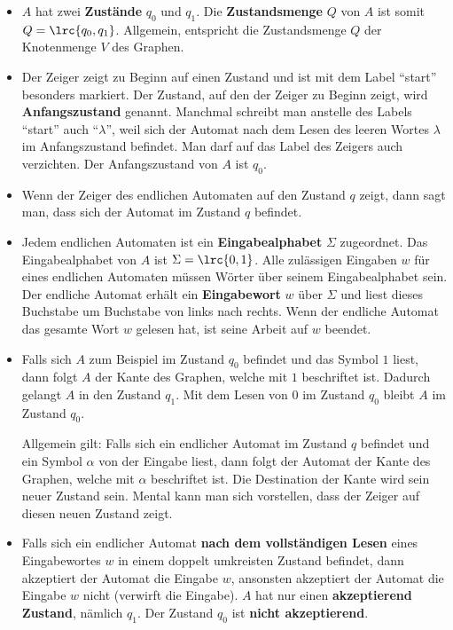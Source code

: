 \begin{itemize}
	\item $A$ hat zwei \textbf{Zustände} $q_0$ und $q_1$. Die \textbf{Zustandsmenge} $Q$ von $A$ ist somit $Q = \lrc{q_0,q_1}$. Allgemein, entspricht die Zustandsmenge $Q$ der Knotenmenge $V$ des Graphen.
	\item Der Zeiger zeigt zu Beginn auf einen Zustand und ist mit dem Label \enquote{start} besonders markiert. Der Zustand, auf den der Zeiger zu Beginn zeigt, wird \textbf{Anfangszustand} genannt. Manchmal schreibt man anstelle des Labels \enquote{start} auch \enquote{$\lambda$}, weil sich der Automat nach dem Lesen des leeren Wortes $\lambda$ im Anfangszustand befindet. Man darf auf das Label des Zeigers auch verzichten. Der Anfangszustand von $A$ ist $q_0$.
	\item Wenn der Zeiger des endlichen Automaten auf den Zustand $q$ zeigt, dann sagt man, dass sich der Automat im Zustand $q$ befindet.
	\item Jedem endlichen Automaten ist ein \textbf{Eingabealphabet} $\Sigma$ zugeordnet. Das Eingabealphabet von $A$ ist $\Sigma = \lrc{0,1}$. Alle zulässigen Eingaben $w$ für eines endlichen Automaten müssen Wörter über seinem Eingabealphabet sein. Der endliche Automat erhält ein \textbf{Eingabewort} $w$ über $\Sigma$ und liest dieses Buchstabe um Buchstabe von links nach rechts. Wenn der endliche Automat das gesamte Wort $w$ gelesen hat, ist seine Arbeit auf $w$ beendet.
	\item Falls sich $A$ zum Beispiel im Zustand $q_0$ befindet und das Symbol $1$ liest, dann folgt $A$ der Kante des Graphen, welche mit $1$ beschriftet ist. Dadurch gelangt $A$ in den Zustand $q_1$. Mit dem Lesen von $0$ im Zustand $q_0$ bleibt $A$ im Zustand $q_0$.

	      Allgemein gilt: Falls sich ein endlicher Automat im Zustand $q$ befindet und ein Symbol $\alpha$ von der Eingabe liest, dann folgt der Automat der Kante des Graphen, welche mit $\alpha$ beschriftet ist. Die Destination der Kante wird sein neuer Zustand sein. Mental kann man sich vorstellen, dass der Zeiger auf diesen neuen Zustand zeigt.
	\item Falls sich ein endlicher Automat \textbf{nach dem vollständigen Lesen} eines Eingabewortes $w$ in einem doppelt umkreisten Zustand befindet, dann akzeptiert der Automat die Eingabe $w$, ansonsten akzeptiert der Automat die Eingabe $w$ nicht (verwirft die Eingabe). $A$ hat nur einen \textbf{akzeptierend Zustand}, nämlich $q_1$. Der Zustand $q_0$ ist \textbf{nicht akzeptierend}.
\end{itemize}
